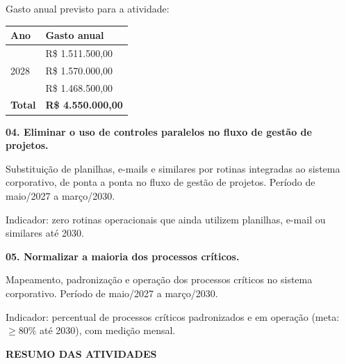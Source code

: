 \documentclass[12pt,a4paper]{article}
\newcommand{\secao}[1]{%
  \par\vspace{6pt}%
  {\noindent\bfseries\color{azulTitulo}\fontsize{13}{16}\selectfont #1}%
  \par\vspace{2pt}%
}
\newcommand{\atividade}[1]{%
  \par{\bfseries\color{azulAtividade}#1}\par
}
\begin{document}
Gasto anual previsto para a atividade:

\begingroup
\footnotesize
{}
\renewcommand{\arraystretch}{1.3}
\setlength{\tabcolsep}{4pt}
\begin{tabular}{|>{\centering\arraybackslash}p{}|>{\raggedleft\arraybackslash}p{}|}
\hline
\cellcolor{azulCabecalho}\bfseries Ano &
\cellcolor{azulCabecalho}\centering\arraybackslash\bfseries Gasto anual \\
\hline
2027 & R\$ 1.511.500,00 \\
\hline
\cellcolor{cinzaClaro}2028 & \cellcolor{cinzaClaro}R\$ 1.570.000,00 \\
\hline
2029 & R\$ 1.468.500,00 \\
\hline
\cellcolor{azulVivo}\bfseries\color{white}Total &
\cellcolor{azulVivo}\bfseries\color{white}R\$ 4.550.000,00 \\
\hline
\end{tabular}
\endgroup

\atividade{04. Eliminar o uso de controles paralelos no fluxo de gestão de projetos.}

Substituição de planilhas, e-mails e similares por rotinas integradas ao sistema corporativo, de ponta a ponta no fluxo de gestão de projetos. Período de maio/2027 a março/2030.

Indicador: zero rotinas operacionais que ainda utilizem planilhas, e-mail ou similares até 2030.

\atividade{05. Normalizar a maioria dos processos críticos.}

Mapeamento, padronização e operação dos processos críticos no sistema corporativo. Período de maio/2027 a março/2030.

Indicador: percentual de processos críticos padronizados e em operação (meta: $\geq 80\%$ até 2030), com medição mensal.

\secao{RESUMO DAS ATIVIDADES}
\end{document}
